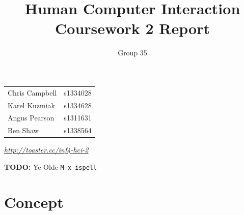 \documentclass[a4paper, notoc]{tufte-handout}
\title{Human Computer Interaction\\ Coursework 2 Report}
\author{Group 35}
\begin{document}
\maketitle %
\vspace{1em}
\begin{tabular}{l r}
  Chris Campbell & s1334028\\
  Karel Kuzmiak  & s1334628\\
  Angus Pearson  & s1311631\\
  Ben Shaw       & s1338564\\
\end{tabular}


\vspace{1em}
\noindent
\href{http://toaster.cc/inf4-hci-2}{\textit{http://toaster.cc/inf4-hci-2}}


\vspace{1em}\noindent \textbf{TODO:} Ye Olde \verb|M-x ispell|

\section{Concept}\label{sec:concept}
\end{document}
